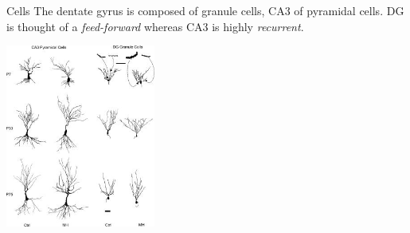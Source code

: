 \documentclass{beamer}
\begin{document}
\begin{frame}{Cells}
  The dentate gyrus is composed of granule cells, CA3 of pyramidal cells. DG is thought of a \textsl{feed-forward} whereas CA3 is highly \textsl{recurrent}.
  \begin{center}
    \includegraphics[height=6cm]{cells.jpg}
  \end{center}
      \vfill
\end{frame}
\end{document}
